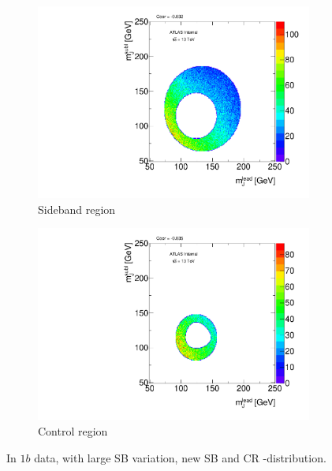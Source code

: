 \begin{figure}[htbp!]
\centering
\captionsetup{justification=centering}
    \begin{subfigure}[b]{0.45\textwidth}
        \includegraphics[width=\textwidth,angle=-90]{figures/boosted/Syst_CRSB/SB_Large_Sideband_OneTag_mH0H1.pdf}
        \caption{Sideband region}
        \label{CRSB:SB_Large_SB}
    \end{subfigure}
    \quad
    \begin{subfigure}[b]{0.45\textwidth}
        \includegraphics[width=\textwidth,angle=-90]{figures/boosted/Syst_CRSB/SB_Large_Control_OneTag_mH0H1.pdf}
        \caption{Control region}
        \label{CRSB:SB_Large_CR}
    \end{subfigure}
\caption{In $1b$ data, with large SB variation, new SB and CR \mleadJ-\msublJ distribution.}
\label{CRSB:SB_Large}
\end{figure}


